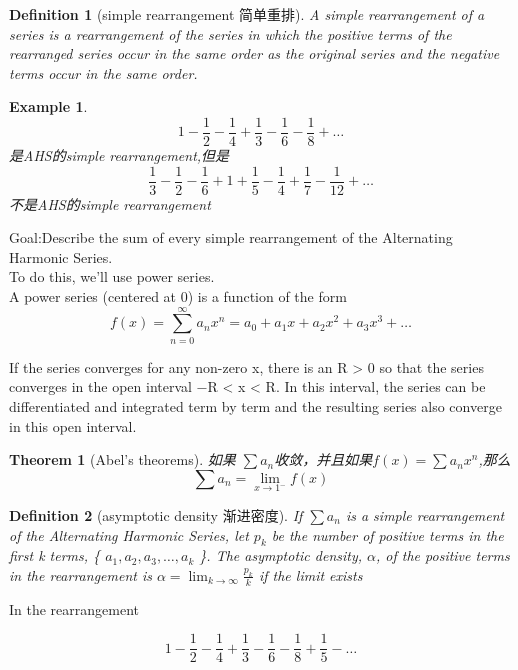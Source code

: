\documentclass{ctexart}
\newtheorem{theorem}{Theorem}
\newtheorem{definition}{Definition}
\newtheorem{example}{Example}
\begin{document}
\begin{definition}[simple rearrangement 简单重排]
A simple rearrangement of a series is a rearrangement of the series in which the positive terms of the rearranged series occur in the same order as the original series and the negative terms occur in the same order.
\end{definition}

\begin{example}

\[ 1- \frac{1}{2} - \frac{1}{4} + \frac{1}{3} - \frac{1}{6} -\frac{1}{8} + \dots \]是AHS的simple rearrangement,但是
\[ \frac{1}{3} - \frac{1}{2} -\frac{1}{6} + 1 + \frac{1}{5} - \frac{1}{4} + \frac{1}{7} - \frac{1}{12} + \dots \] 不是AHS的simple rearrangement

\end{example}

Goal:Describe the sum of every simple rearrangement of the Alternating Harmonic Series.\\
To do this, we’ll use power series.\\
A power series (centered at 0) is a function of the form \[ f(x)= \sum\limits_{n=0}^{\infty}a_nx^n = a_0 + a_1x + a_2x^2 + a_3 x^3 + \dots  \]

If the series converges for any non-zero x, there is an R > 0 so that the series converges in the open interval −R < x < R. In this interval, the series can be differentiated and integrated term by term and the resulting series also converge in this open interval.

\begin{theorem}[Abel's theorems]
如果 \(\sum a_n\)收敛，并且如果\(f(x) = \sum a_n x^n \),那么 \[ \sum a_n = \lim_{x \to 1^-} f(x) \]
\end{theorem}

\begin{definition}[asymptotic density 渐进密度]

If \(\sum a_n \) is a simple rearrangement of the Alternating Harmonic Series, let \(p_k\) be the number of positive terms in the first k terms, \{ \(a_1, a_2, a_3, \dots , a_k \) \}. The asymptotic density, \( \alpha \), of the positive terms in the rearrangement is \( \alpha = \lim_{k \to \infty} \frac{p_k}{k} \) if the limit exists
\end{definition}

In the rearrangement 

\[
1 - \frac{1}{2} - \frac{1}{4} + \frac{1}{3} - \frac{1}{6} - \frac{1}{8} + \frac{1}{5} - \dots
\]
\end{document}
